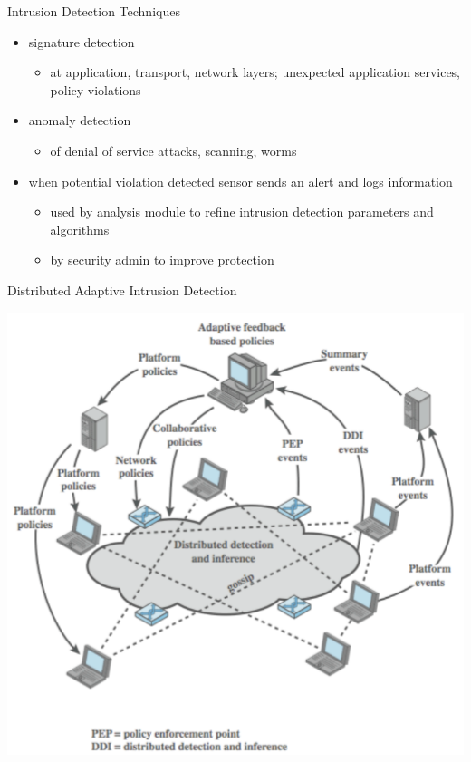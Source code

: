 \documentclass{beamer}
\begin{document}
\begin{frame}{Intrusion Detection Techniques}
  \begin{itemize}
  \item signature detection 
    \begin{itemize}
    \item at application, transport, network layers; unexpected 
      application services, policy violations 
    \end{itemize}
  \item anomaly detection 
    \begin{itemize}
    \item of denial of service attacks, scanning, worms 
    \end{itemize}
  \item when potential violation detected sensor sends an 
    alert and logs information 
    \begin{itemize}
    \item used by analysis module to refine intrusion detection 
      parameters and algorithms 
    \item by security admin to improve protection
    \end{itemize}
  \end{itemize}
\end{frame}

\begin{frame}{Distributed Adaptive Intrusion Detection}
   \begin{center}
    \includegraphics[width=0.6\linewidth]{daids}
  \end{center}
\end{frame}
\end{document}
